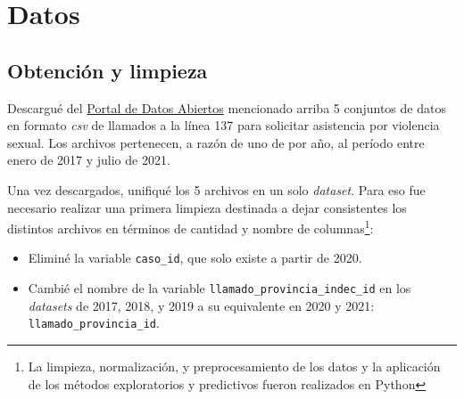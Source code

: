 \documentclass[10 pt]{article}
\begin{document}
\section{Datos}\label{datos}

\subsection{Obtención y limpieza}\label{limpieza}
Descargué del \href{http://datos.jus.gob.ar/}{Portal de Datos Abiertos} mencionado arriba 5 conjuntos de datos en formato \textit{csv} de llamados a la línea 137 para solicitar asistencia por violencia sexual. Los archivos pertenecen, a razón de uno de por año, al período entre enero de 2017 y julio de 2021. 

Una vez descargados, unifiqué los 5 archivos en un solo \textit{dataset}. Para eso fue necesario realizar una primera limpieza destinada a dejar consistentes los distintos archivos en términos de cantidad y nombre de columnas\footnote{La limpieza, normalización, y preprocesamiento de los datos y la aplicación de los métodos exploratorios y predictivos fueron realizados en Python}:

\begin{itemize}
    \item Eliminé la variable \texttt{caso\_id}, que solo existe a partir de 2020.
    \item Cambié el nombre de la variable \texttt{llamado\_provincia\_indec\_id} en los \textit{datasets} de 2017, 2018, y 2019 a su equivalente en 2020 y 2021: \texttt{llamado\_provincia\_id}.
\end{itemize}
\end{document}
